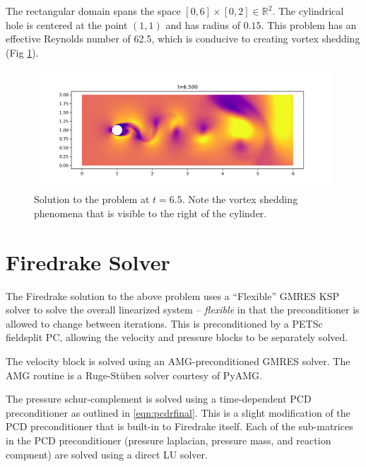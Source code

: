 \documentclass{article}
\begin{document}
The rectangular domain spans the space $\left[0,6\right]\times\left[0,2\right]\in\mathbb{R}^2$.  The cylindrical hole is centered at the point $\left(1,1\right)$ and has radius of $0.15$.  This problem has an effective Reynolds number of 62.5, which is conducive to creating vortex shedding (Fig \ref{fig:vortex}).
\begin{figure}[h]
  \includegraphics[width=\textwidth]{figures/vortex.png}
  \caption{Solution to the problem at $t=6.5$.  Note the vortex shedding phenomena that is visible to the right of the cylinder.}
  \label{fig:vortex}
\end{figure}

\section{Firedrake Solver}
The Firedrake\cite{Firedrake} solution to the above problem uses a ``Flexible'' GMRES KSP solver to solve the overall linearized system -- \textit{flexible} in that the preconditioner is allowed to change between iterations.  This is preconditioned by a PETSc fieldsplit PC, allowing the velocity and pressure blocks to be separately solved.

The velocity block is solved using an AMG-preconditioned GMRES solver.  The AMG routine is a Ruge-St\"uben solver courtesy of PyAMG\cite{OlSc2018}.

The pressure schur-complement is solved using a time-dependent PCD preconditioner as outlined in \eqref{eqn:pcdrfinal}.  This is a slight modification of the PCD preconditioner that is built-in to Firedrake itself.  Each of the sub-matrices in the PCD preconditioner (pressure laplacian, pressure mass, and reaction compnent) are solved using a direct LU solver.
\end{document}
